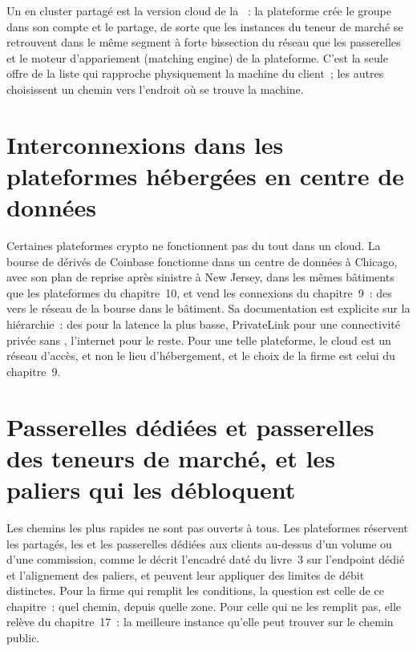 Un  en cluster partagé est la version cloud de la ~: la plateforme crée le groupe dans son compte et le partage, de sorte que les
instances du teneur de marché se retrouvent dans le même segment à forte bissection du réseau que les passerelles et le moteur d'appariement (matching engine) de la plateforme. C'est la seule
offre de la liste qui rapproche physiquement la machine du client~; les autres choisissent un chemin vers l'endroit où se trouve la machine.

\section{Interconnexions dans les plateformes hébergées en centre de données}

Certaines plateformes crypto ne fonctionnent pas du tout dans un cloud. La bourse de dérivés de Coinbase fonctionne dans un centre de données à Chicago, avec son plan de reprise après sinistre à New
Jersey, dans les mêmes bâtiments que les plateformes du chapitre~10, et vend les connexions du chapitre~9~: des  vers le réseau de la bourse dans le bâtiment.
Sa documentation est explicite sur la hiérarchie~: des  pour la latence la plus basse, PrivateLink pour une connectivité privée sans
, l'internet pour le reste. Pour une telle plateforme, le cloud est un réseau d'accès, et non le lieu d'hébergement, et le choix de la firme est celui du chapitre~9.

\section{Passerelles dédiées et passerelles des teneurs de marché, et les paliers qui les débloquent}

Les chemins les plus rapides ne sont pas ouverts à tous. Les plateformes réservent les  partagés, les  et les passerelles dédiées aux clients au-dessus d'un
volume ou d'une commission, comme le décrit l'encadré daté du livre~3 sur l'endpoint dédié et l'alignement des paliers, et peuvent leur appliquer des limites de débit distinctes.
Pour la firme qui remplit les conditions, la question est celle de ce chapitre~: quel chemin, depuis quelle zone. Pour celle qui ne les remplit pas, elle relève du chapitre~17~:
la meilleure instance qu'elle peut trouver sur le chemin public.

